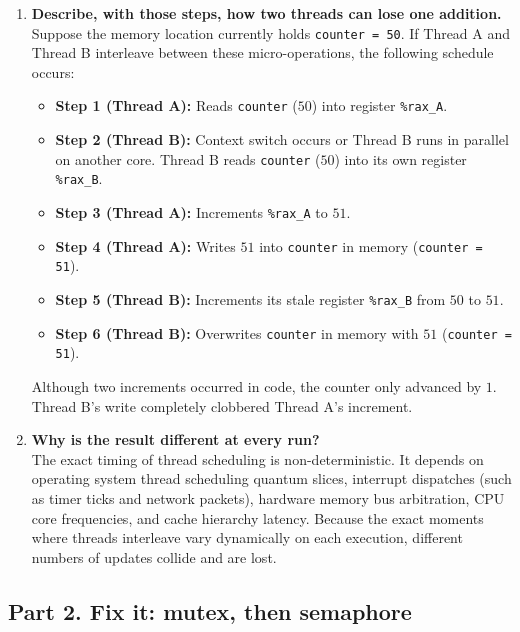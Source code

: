 \documentclass{labreport}
\begin{document}
\begin{enumerate}[leftmargin=*]
    \item \textbf{Describe, with those steps, how two threads can lose one addition.}\\[0.2em]
    Suppose the memory location currently holds \texttt{counter = 50}. If Thread A and Thread B interleave between these micro-operations, the following schedule occurs:
    \begin{itemize}[noitemsep]
        \item \textbf{Step 1 (Thread A):} Reads \texttt{counter} ($50$) into register \texttt{\%rax\_A}.
        \item \textbf{Step 2 (Thread B):} Context switch occurs or Thread B runs in parallel on another core. Thread B reads \texttt{counter} ($50$) into its own register \texttt{\%rax\_B}.
        \item \textbf{Step 3 (Thread A):} Increments \texttt{\%rax\_A} to $51$.
        \item \textbf{Step 4 (Thread A):} Writes $51$ into \texttt{counter} in memory (\texttt{counter = 51}).
        \item \textbf{Step 5 (Thread B):} Increments its stale register \texttt{\%rax\_B} from $50$ to $51$.
        \item \textbf{Step 6 (Thread B):} Overwrites \texttt{counter} in memory with $51$ (\texttt{counter = 51}).
    \end{itemize}
    Although two increments occurred in code, the counter only advanced by $1$. Thread B's write completely clobbered Thread A's increment.

    \item \textbf{Why is the result different at every run?}\\[0.2em]
    The exact timing of thread scheduling is non-deterministic. It depends on operating system thread scheduling quantum slices, interrupt dispatches (such as timer ticks and network packets), hardware memory bus arbitration, CPU core frequencies, and cache hierarchy latency. Because the exact moments where threads interleave vary dynamically on each execution, different numbers of updates collide and are lost.
\end{enumerate}

\subsection{Part 2. Fix it: mutex, then semaphore}
\end{document}
